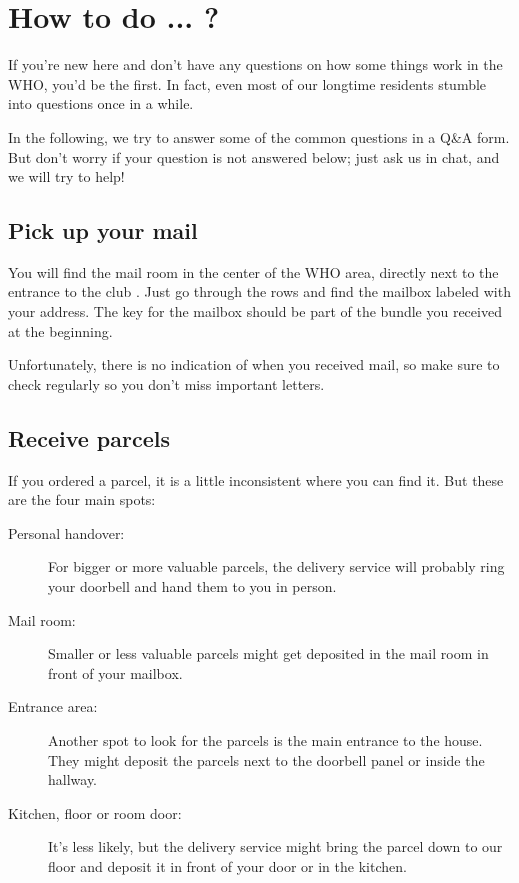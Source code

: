 \chapter{How to do ... ?} \label{chap:qna}
If you're new here and don't have any questions on how some things work in the WHO, you'd be the first. In fact, even most of our longtime residents stumble into questions once in a while.

In the following, we try to answer some of the common questions in a Q\&A form. But don't worry if your question is not answered below; just ask us in chat, and we will try to help!

\section{Pick up your mail} \label{sec:qna-mail}
You will find the mail room in the center of the WHO area, directly next to the entrance to the club . Just go through the rows and find the mailbox labeled with your address. The key for the mailbox should be part of the bundle you received at the beginning. 

Unfortunately, there is no indication of when you received mail, so make sure to check regularly so you don't miss important letters.

\section{Receive parcels}
If you ordered a parcel, it is a little inconsistent where you can find it. But these are the four main spots:
\begin{description}
    \item[Personal handover:] For bigger or more valuable parcels, the delivery service will probably ring your doorbell and hand them to you in person.
    \item[Mail room:] Smaller or less valuable parcels might get deposited in the mail room in front of your mailbox.
    \item[Entrance area:] Another spot to look for the parcels is the main entrance to the house. They might deposit the parcels next to the doorbell panel or inside the hallway.
    \item[Kitchen, floor or room door:] It's less likely, but the delivery service might bring the parcel down to our floor and deposit it in front of your door or in the kitchen.
\end{description}


